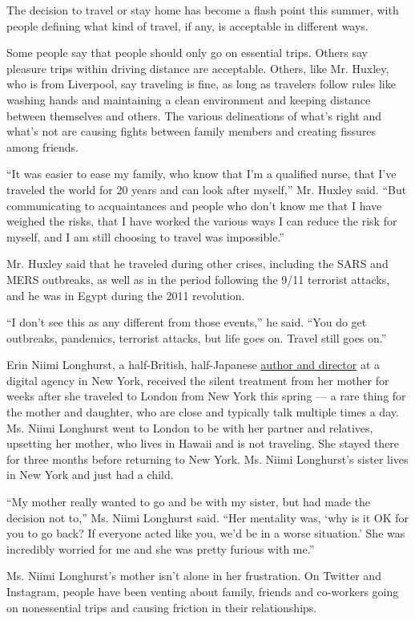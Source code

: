The decision to travel or stay home has become a flash point this
summer, with people defining what kind of travel, if any, is acceptable
in different ways.

Some people say that people should only go on essential trips. Others
say pleasure trips within driving distance are acceptable. Others, like
Mr. Huxley, who is from Liverpool, say traveling is fine, as long as
travelers follow rules like washing hands and maintaining a clean
environment and keeping distance between themselves and others. The
various delineations of what's right and what's not are causing fights
between family members and creating fissures among friends.

``It was easier to ease my family, who know that I'm a qualified nurse,
that I've traveled the world for 20 years and can look after myself,''
Mr. Huxley said. ``But communicating to acquaintances and people who
don't know me that I have weighed the risks, that I have worked the
various ways I can reduce the risk for myself, and I am still choosing
to travel was impossible.''

Mr. Huxley said that he traveled during other crises, including the SARS
and MERS outbreaks, as well as in the period following the 9/11
terrorist attacks, and he was in Egypt during the 2011 revolution.

``I don't see this as any different from those events,'' he said. ``You
do get outbreaks, pandemics, terrorist attacks, but life goes on. Travel
still goes on.''

Erin Niimi Longhurst, a half-British, half-Japanese
\href{https://www.erinniimilonghurst.com/}{author and director} at a
digital agency in New York, received the silent treatment from her
mother for weeks after she traveled to London from New York this spring
--- a rare thing for the mother and daughter, who are close and
typically talk multiple times a day. Ms. Niimi Longhurst went to London
to be with her partner and relatives, upsetting her mother, who lives in
Hawaii and is not traveling. She stayed there for three months before
returning to New York. Ms. Niimi Longhurst's sister lives in New York
and just had a child.

``My mother really wanted to go and be with my sister, but had made the
decision not to,'' Ms. Niimi Longhurst said. ``Her mentality was, `why
is it OK for you to go back? If everyone acted like you, we'd be in a
worse situation.' She was incredibly worried for me and she was pretty
furious with me.''

Ms. Niimi Longhurst's mother isn't alone in her frustration. On Twitter
and Instagram, people have been venting about family, friends and
co-workers going on nonessential trips and causing friction in their
relationships.


